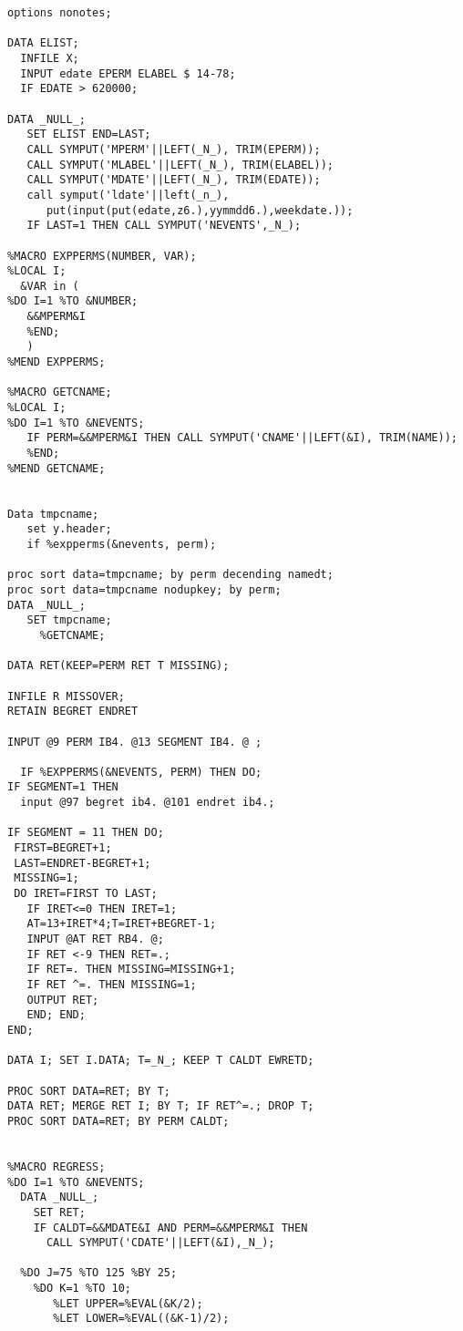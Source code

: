 \begin{singlespace}
\begin{lstlisting}[language=sas,caption=Event studies with SAS]
  options nonotes;

DATA ELIST;
  INFILE X;
  INPUT edate EPERM ELABEL $ 14-78;
  IF EDATE > 620000;

DATA _NULL_;
   SET ELIST END=LAST;
   CALL SYMPUT('MPERM'||LEFT(_N_), TRIM(EPERM));
   CALL SYMPUT('MLABEL'||LEFT(_N_), TRIM(ELABEL));
   CALL SYMPUT('MDATE'||LEFT(_N_), TRIM(EDATE));
   call symput('ldate'||left(_n_),
      put(input(put(edate,z6.),yymmdd6.),weekdate.));
   IF LAST=1 THEN CALL SYMPUT('NEVENTS',_N_);

%MACRO EXPPERMS(NUMBER, VAR);
%LOCAL I;
  &VAR in (
%DO I=1 %TO &NUMBER;
   &&MPERM&I
   %END;
   )
%MEND EXPPERMS;

%MACRO GETCNAME;
%LOCAL I;
%DO I=1 %TO &NEVENTS;
   IF PERM=&&MPERM&I THEN CALL SYMPUT('CNAME'||LEFT(&I), TRIM(NAME));
   %END;
%MEND GETCNAME;


Data tmpcname;
   set y.header;
   if %expperms(&nevents, perm);

proc sort data=tmpcname; by perm decending namedt;
proc sort data=tmpcname nodupkey; by perm;
DATA _NULL_;
   SET tmpcname;
     %GETCNAME;

DATA RET(KEEP=PERM RET T MISSING);

INFILE R MISSOVER;
RETAIN BEGRET ENDRET

INPUT @9 PERM IB4. @13 SEGMENT IB4. @ ;

  IF %EXPPERMS(&NEVENTS, PERM) THEN DO;
IF SEGMENT=1 THEN
  input @97 begret ib4. @101 endret ib4.;

IF SEGMENT = 11 THEN DO;
 FIRST=BEGRET+1;
 LAST=ENDRET-BEGRET+1;
 MISSING=1;
 DO IRET=FIRST TO LAST;
   IF IRET<=0 THEN IRET=1;
   AT=13+IRET*4;T=IRET+BEGRET-1;
   INPUT @AT RET RB4. @;
   IF RET <-9 THEN RET=.;
   IF RET=. THEN MISSING=MISSING+1;
   IF RET ^=. THEN MISSING=1;
   OUTPUT RET;
   END; END;
END;

DATA I; SET I.DATA; T=_N_; KEEP T CALDT EWRETD;

PROC SORT DATA=RET; BY T;
DATA RET; MERGE RET I; BY T; IF RET^=.; DROP T;
PROC SORT DATA=RET; BY PERM CALDT;


%MACRO REGRESS;
%DO I=1 %TO &NEVENTS;
  DATA _NULL_;
    SET RET;
    IF CALDT=&&MDATE&I AND PERM=&&MPERM&I THEN
      CALL SYMPUT('CDATE'||LEFT(&I),_N_);

  %DO J=75 %TO 125 %BY 25;
    %DO K=1 %TO 10;
       %LET UPPER=%EVAL(&K/2);
       %LET LOWER=%EVAL((&K-1)/2);


\end{lstlisting}
\end{singlespace}
